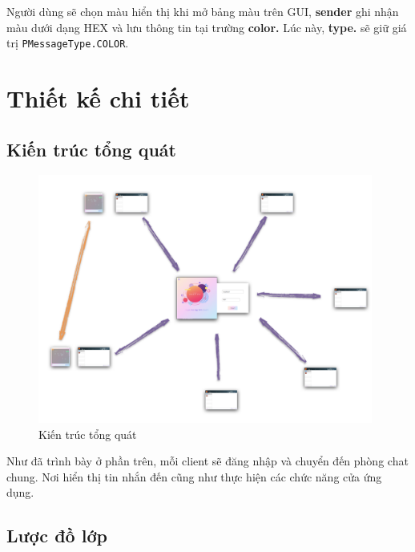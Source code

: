 \documentclass[a4paper]{article}
\begin{document}
Người dùng sẽ chọn màu hiển thị khi mở bảng màu trên GUI, {\bf sender} ghi nhận màu dưới dạng HEX và lưu thông tin tại trường {\bf color.} Lúc này, {\bf type.} sẽ giữ giá trị {\tt PMessageType.COLOR}.
\newpage

\section{Thiết kế chi tiết}
\subsection{Kiến trúc tổng quát}

\begin{figure}[h!]
	\centering
	\includegraphics[width=11cm]{architecture}
	\caption{Kiến trúc tổng quát}
\end{figure}

Như đã trình bày ở phần trên, mỗi client sẽ đăng nhập và chuyển đến phòng chat chung. Nơi hiển thị tin nhắn đến cũng như thực hiện các chức năng cửa ứng dụng.

\newpage
\subsection{Lược đồ lớp}
\end{document}
